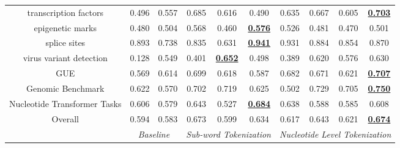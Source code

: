 \begin{table*}[]
\begin{center}
\begin{tabular}{@{}c|cc|ccc|cccc@{}}
transcription factors & 0.496 & 0.557 & 0.685 & 0.616 & 0.490 & 0.635 & 0.667 & 0.605 & \textbf{\underline{0.703}} \\
epigenetic marks & 0.480 & 0.504 & 0.568 & 0.460 & \textbf{\underline{0.576}} & 0.526 & 0.481 & 0.470 & 0.501 \\
splice sites & 0.893 & 0.738 & 0.835 & 0.631 & \textbf{\underline{0.941}} & 0.931 & 0.884 & 0.854 & 0.870 \\
virus variant detection & 0.128 & 0.549 & 0.401 & \textbf{\underline{0.652}} & 0.498 & 0.389 & 0.620 & 0.576 & 0.630 \\
\midrule
GUE & 0.569 & 0.614 & 0.699 & 0.618 & 0.587 & 0.682 & 0.671 & 0.621 & \textbf{\underline{0.707}} \\
Genomic Benchmark & 0.622 & 0.570 & 0.702 & 0.719 & 0.625 & 0.502 & 0.729 & 0.705 & \textbf{\underline{0.750}} \\
Nucleotide Transformer Tasks & 0.606 & 0.579 & 0.643 & 0.527 & \textbf{\underline{0.684}} & 0.638 & 0.588 & 0.585 & 0.608 \\
\midrule
Overall & 0.594 & 0.583 & 0.673 & 0.599 & 0.634 & 0.617 & 0.643 & 0.621 & \textbf{\underline{0.674}} \\
\midrule
\multicolumn{1}{l|}{} & \multicolumn{2}{c|}{\textit{Baseline}} & \multicolumn{3}{c|}{\textit{Sub-word Tokenization}} & \multicolumn{4}{c}{\textit{Nucleotide Level Tokenization}}
\end{tabular}
\end{center}
\end{table*}